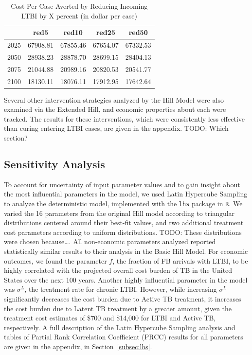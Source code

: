 \documentclass{amsart}
\begin{document}
\begin{table}
\centering
\begin{tabular}{|r|cccc|} \hline
       & red5     & red10    & red25    & red50    \\ \hline
  2025 & 67908.81 & 67855.46 & 67654.07 & 67332.53 \\ 
  2050 & 28938.23 & 28878.70 & 28699.15 & 28404.13 \\ 
  2075 & 21044.88 & 20989.16 & 20820.53 & 20541.77 \\ 
  2100 & 18130.11 & 18076.11 & 17912.95 & 17642.64 \\ \hline
\end{tabular}
\caption{Cost Per Case Averted by Reducing Incoming LTBI by X percent (in dollar per case)} 
\label{tab:cpcaArt}
\end{table}

Several other intervention strategies analyzed by the Hill Model were also
examined via the Extended Hill, and economic properties about each were tracked.
The results for these interventions, which were consistently less effective than
curing entering LTBI cases, are given in the appendix. {\huge \color{red} TODO:
Which section?}

\subsection{Sensitivity Analysis}
To account for uncertainty of input parameter values and to gain insight about
the most influential parameters in the model, we used Latin Hypercube Sampling
to analyze the deterministic model, implemented with the \texttt{lhs} package in
\texttt{R}.  We varied the 16 parameters from the original Hill model according
to triangular distributions centered around their best-fit values, and two
additional treatment cost parameters according to uniform distributions.
{\huge\color{red} TODO: These distributions were chosen because\ldots}. All
non-economic parameters analyzed reported statistically similar results to their
analysis in the Basic Hill Model. For economic outcomes, we found the parameter
$f$, the fraction of FB arrivals with LTBI, to be highly correlated with the
projected overall cost burden of TB in the United States over the next 100
years.  Another highly influential parameter in the model was $\sigma^{L}$, the
treatment rate for chronic LTBI.  However, while increasing $\sigma^{L}$
significantly decreases the cost burden due to Active TB treatment, it increases
the cost burden due to Latent TB treatment by a greater amount, given the
treatment cost estimates of \$700 and \$14,000 for LTBI and Active TB,
respectively.  A full description of the Latin Hypercube Sampling analysis and
tables of Partial Rank Correlation Coefficient (PRCC) results for all parameters
are given in the appendix, in Section~\ref{subsec:lhs}.
\end{document}
